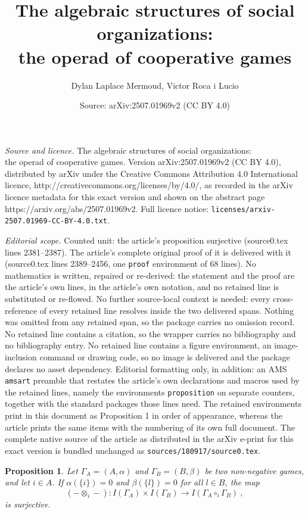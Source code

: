 \documentclass[10pt,a4paper]{amsart}
\title{The algebraic structures of social organizations: \\ the operad of cooperative games}
\author{Dylan Laplace Mermoud, Victor Roca i Lucio}
\date{Source: arXiv:2507.01969v2 (CC BY 4.0)}
\newtheorem{proposition}{Proposition}
\begin{document}
\maketitle

\noindent\emph{Source and licence.} The algebraic structures of social organizations: \\ the operad of cooperative games. Version arXiv:2507.01969v2 (CC BY 4.0), distributed by arXiv under the Creative Commons Attribution 4.0 International licence, http://creativecommons.org/licenses/by/4.0/, as recorded in the arXiv licence metadata for this exact version and shown on the abstract page https://arxiv.org/abs/2507.01969v2. Full licence notice: \texttt{licenses/arxiv-2507.01969-CC-BY-4.0.txt}.\par\smallskip

\noindent\textit{Editorial scope.} Counted unit: the article's proposition surjective (source0.tex lines 2381--2387). The article's complete original proof of it is delivered with it (source0.tex lines 2389--2456, one \texttt{proof} environment of 68 lines). No mathematics is written, repaired or re-derived: the statement and the proof are the article's own lines, in the article's own notation, and no retained line is substituted or re-flowed.  No further source-local context is needed: every cross-reference of every retained line resolves inside the two delivered spans.  Nothing was omitted from any retained span, so the package carries no omission record.  No retained line contains a citation, so the wrapper carries no bibliography and no bibliography entry.  No retained line contains a figure environment, an image-inclusion command or drawing code, so no image is delivered and the package declares no asset dependency.  Editorial formatting only, in addition: an AMS \texttt{amsart} preamble that restates the article's own declarations and macros used by the retained lines, namely the environments \texttt{proposition} on separate counters, together with the standard packages those lines need.  The retained environments print in this document as Proposition 1 in order of appearance, whereas the article prints the same items with the numbering of its own full document.  The complete native source of the article as distributed in the arXiv e-print for this exact version is bundled unchanged as \texttt{sources/180917/source0.tex}.
\begin{proposition}\label{prop: tensor of imputations is surjective}
Let \(\Gamma_A = (A, \alpha)\) and \(\Gamma_B =(B, \beta)\) be two non-negative games, and let \(i \in A\). If $\alpha(\{i\}) = 0$ and \(\beta(\{l\}) = 0\) for all \(l \in B\), the map
\[
(- \otimes_i -): I(\Gamma_A) \times I(\Gamma_B) \longrightarrow I(\Gamma_A \circ_i \Gamma_B)~, 
\]
is surjective. 
\end{proposition}
\end{document}
